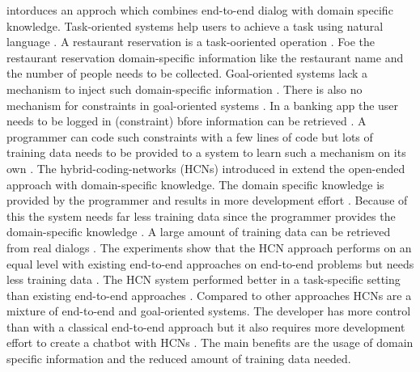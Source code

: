 \citet{williams2017hybrid} intorduces an approch which combines end-to-end dialog with domain specific knowledge.
Task-oriented systems help users to achieve a task using natural language \cite{williams2017hybrid}.
A restaurant reservation is a task-ooriented operation \cite{williams2017hybrid}.
Foe the restaurant reservation domain-specific information like the restaurant name and the number of people
needs to be collected.
Goal-oriented systems lack a mechanism to inject such domain-specific information \citet{williams2017hybrid}.
There is also no mechanism for constraints in goal-oriented systems \cite{williams2017hybrid}.
In a banking app the user needs to be logged in (constraint) bfore information can be retrieved \cite{williams2017hybrid}.
A programmer can code such constraints with a few lines of code but lots of training data needs to be provided 
to a system to learn such a mechanism on its own \cite{williams2017hybrid}.
The hybrid-coding-networks (HCNs) introduced in \citet{williams2017hybrid} extend the open-ended approach 
with domain-specific knowledge. 
The domain specific knowledge is provided by the programmer and results in more development effort \cite{williams2017hybrid}.
Because of this the system needs far less training data since the programmer provides the domain-specific knowledge \cite{williams2017hybrid}.
A large amount of training data can be retrieved from real dialogs \cite{williams2017hybrid}.
The experiments show that the HCN approach performs on an equal level with 
existing end-to-end approaches on end-to-end problems but needs less training data \cite{williams2017hybrid}. 
The HCN system performed better in a task-specific setting than existing end-to-end approaches \cite{williams2017hybrid}.
Compared to other approaches HCNs are a mixture of end-to-end and goal-oriented systems.
The developer has more control than with a classical end-to-end approach but 
it also requires more development effort to create a chatbot with HCNs \cite{williams2017hybrid}.
The main benefits are the usage of domain specific information and the reduced amount of training data needed.

